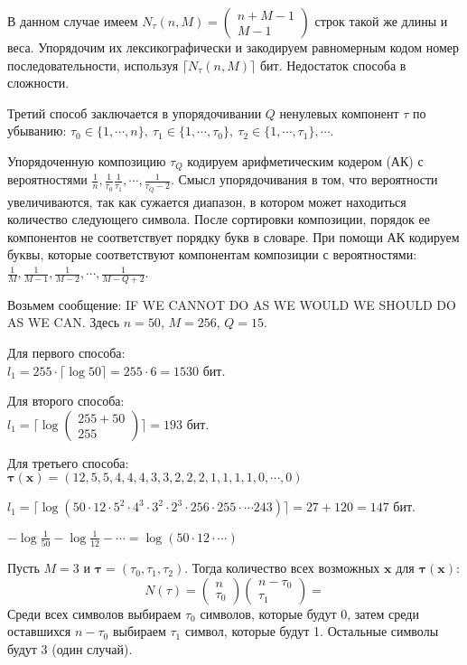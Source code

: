 {В данном случае имеем $N_{\tau}(n, M) = \begin{pmatrix} n + M - 1 \\ M - 1
\end{pmatrix}$ строк такой же длины и веса. Упорядочим их лексикографически и
закодируем равномерным кодом номер последовательности, используя $\lceil
N_{\tau}(n, M) \rceil$ бит. Недостаток способа в сложности.

Третий способ заключается в упорядочивании $Q$ ненулевых компонент $\tau$ по
убыванию: $\tau_0 \in \{1, \cdots, n\},\ \tau_1 \in \{1, \cdots, \tau_0\},\
\tau_2 \in \{1, \cdots, \tau_1\}, \cdots$.

Упорядоченную композицию $\tau_Q$ кодируем арифметическим кодером (АК) с
вероятностями $\frac{1}{n}, \frac{1}{\tau_0}
\frac{1}{\tau_1}, \cdots, \frac{1}{\tau_Q - 2}$. Смысл упорядочивания в том,
что вероятности увеличиваются, так как сужается диапазон, в котором может
находиться количество следующего символа. После сортировки композиции, порядок
ее компонентов не соответствует порядку букв в словаре. При
помощи АК кодируем буквы,
которые соответствуют компонентам композиции с вероятностями: $\frac{1}{M},
\frac{1}{M - 1}, \frac{1}{M - 2}, \cdots, \frac{1}{M - Q + 2}$.

Возьмем сообщение: IF WE CANNOT DO AS WE WOULD WE SHOULD DO AS WE CAN. Здесь $n
= 50$, $M = 256$, $Q = 15$.

Для первого способа:\\
$l_1 = 255 \cdot \lceil \log 50 \rceil = 255 \cdot 6 = 1530$ бит.

Для второго способа:\\
$l_1 = \lceil \log \begin{pmatrix} 255 + 50 \\ 255 \end{pmatrix} \rceil = 193$
бит.

Для третьего способа:\\
$\bm{\tau(x)} = (12, 5, 5, 4, 4, 4, 3, 3, 2, 2, 2, 1, 1, 1, 1, 0, \cdots, 0)$

$l_1 = \lceil \log(50 \cdot 12 \cdot 5^2 \cdot 4^3 \cdot 3^2 \cdot 2^3 \cdot
256 \cdot 255 \cdot \cdots 243) \rceil = 27 + 120 = 147$ бит.

$-\log \frac{1}{50} - \log \frac{1}{12} - \cdots = \log(50 \cdot 12 \cdot \cdots)$

Пусть $M = 3$ и $\bm{\tau} = (\tau_0, \tau_1, \tau_2)$. Тогда количество всех
возможных $\bm{x}$ для $\bm{\tau(x)}$:
\[
    N(\tau) =
    \begin{pmatrix}
        n \\ \tau_0
    \end{pmatrix}
    \begin{pmatrix}
        n - \tau_0 \\ \tau_1
    \end{pmatrix} =
\]
Среди всех символов выбираем $\tau_0$ символов, которые будут 0, затем среди
оставшихся $n - \tau_0$ выбираем $\tau_1$ символ, которые будут 1. Остальные
символы будут 3 (один случай).

}
